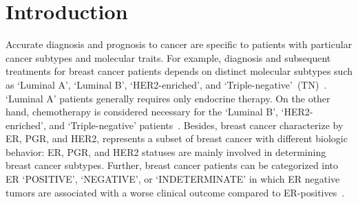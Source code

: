 \section{Introduction}
\label{secIntroduction_Motivation}
Accurate diagnosis and prognosis to cancer are specific to patients with particular cancer subtypes and molecular traits. For example, diagnosis and subsequent treatments for breast cancer patients depends on distinct molecular subtypes such as `Luminal A', `Luminal B', `HER2-enriched', and `Triple-negative'~(TN)~\cite{sorlie,dai}. `Luminal A' patients generally requires only endocrine therapy. On the other hand, chemotherapy is considered necessary for the `Luminal B', `HER2-enriched', and `Triple-negative' patients~\cite{goldhirsch}. Besides, breast cancer characterize by ER, PGR, and HER2, represents a subset of breast cancer with different biologic behavior: ER, PGR, and HER2 statuses are mainly involved in determining breast cancer subtypes. %
Further, breast cancer patients can be categorized into ER `POSITIVE', `NEGATIVE', or `INDETERMINATE' in which ER negative tumors are associated with a worse clinical outcome compared to ER-positives~\cite{karimACCA2019}. 


